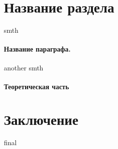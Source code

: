 \documentclass[12pt,twoside]{article}
\begin{document}
\section{Название раздела}
smth

\paragraph{Название параграфа.}
another smth

\paragraph{Теоретическая часть} 


\section{Заключение}
final
\end{document}
